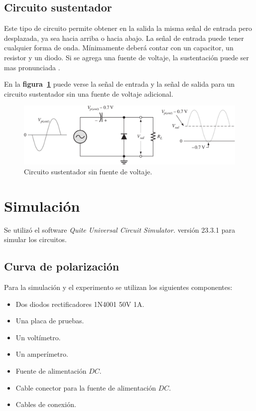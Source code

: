 \documentclass[letter,twoside,11pt]{article}
\begin{document}
\subsection{Circuito sustentador}
Este tipo de circuito permite obtener en la salida la misma señal de entrada
pero desplazada, ya sea hacia arriba o hacia abajo. La señal de entrada puede
tener cualquier forma de onda. Mínimamente deberá contar con un capacitor, un
resistor y un diodo. Si se agrega una fuente de voltaje, la sustentación puede
ser mas pronunciada \cite{Tancara}.

En la \textbf{figura~\ref{fijador1}} puede verse la señal de entrada y la señal
de salida para un circuito sustentador sin una fuente de voltaje adicional.

\begin{figure}[!h]
\centering
\includegraphics[scale=0.30]{figura4.eps}
\caption{Circuito sustentador sin fuente de voltaje.}
\label{fijador1}
\end{figure}

\section{Simulación}
Se utilizó el software \emph{Quite Universal Circuit Simulator.} versión 23.3.1
para simular los circuitos.

\subsection{Curva de polarización}
Para la simulación y el experimento se utilizan los siguientes componentes:

\begin{itemize}
    \item Dos diodos rectificadores 1N4001 50V 1A.
    \item Una placa de pruebas.
    \item Un voltímetro.
    \item Un amperímetro.
    \item Fuente de alimentación $DC$.
    \item Cable conector para la fuente de alimentación $DC$.
    \item Cables de conexión.
\end{itemize}
\end{document}

